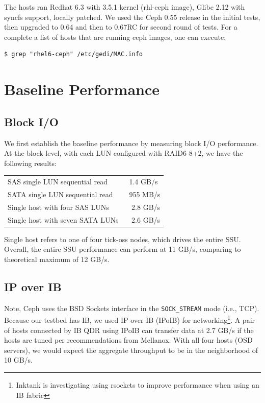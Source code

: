 \documentclass{article}
\begin{document}
The hosts ran Redhat 6.3 with 3.5.1 kernel (rhl-ceph image), Glibc 2.12
with syncfs support, locally patched. We used the Ceph 0.55 release in the
initial tests, then upgraded to 0.64 and then to 0.67RC for second round of tests. For a
complete a list of hosts that are running ceph images, one can execute:

\begin{Verbatim}
$ grep "rhel6-ceph" /etc/gedi/MAC.info
\end{Verbatim}


\section{Baseline Performance}


\subsection*{Block I/O}
We first establish the baseline performance by measuring block I/O performance.
At the block level, with each LUN configured with RAID6 8+2, we have the following
results:

\begin{table}[htb]
\centering
\begin{tabular}{ll}
    \toprule
    SAS single LUN sequential read & ~1.4 GB/s \\
    SATA single LUN sequential read & ~955 MB/s \\[0.5em]
    Single host with four SAS LUNs & ~ 2.8 GB/s \\
    Single host with seven SATA LUNs & ~ 2.6 GB/s \\
    \bottomrule
\end{tabular}

\end{table}

Single host refers to one of four tick-oss nodes, which drives the entire SSU.
Overall, the entire SSU performance can perform at 11 GB/s, comparing to
theoretical maximum of 12 GB/s.


\subsection*{IP over IB}

Note, Ceph uses the BSD Sockets interface in the \texttt{SOCK\_STREAM} mode (i.e., TCP).
Because our testbed has IB, we used IP over IB (IPoIB) for networking\footnote{Inktank is 
investigating using rsockets to improve performance when using an IB fabric}.
A pair of hosts connected by IB QDR using IPoIB can transfer data at 2.7 GB/s if the
hosts are tuned per recommendations from Mellanox. With all four hosts (OSD servers), we would expect
the aggregate throughput to be in the neighborhood of 10 GB/s.
\end{document}
